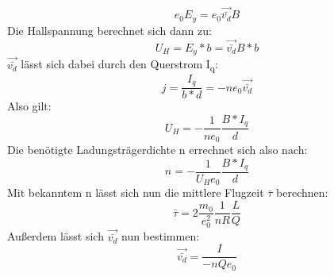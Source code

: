\documentclass[titlepage=firstcover, captions=tableheading]{scrartcl}
\begin{document}
\begin{equation}
    e_0E_y=e_0\vec{\bar{v_d}}B
\end{equation}
Die Hallspannung berechnet sich dann zu:
\begin{equation}
    U_H=E_y*b=\vec{\bar{v_d}}B*b
\end{equation}
$\vec{\bar{v_d}}$ lässt sich dabei durch den Querstrom I\textsubscript{q}:
\begin{equation}
    j=\frac{I_q}{b*d}=-ne_0\vec{\bar{v_d}}
\end{equation}
Also gilt:
\begin{equation}
    U_H=-\frac{1}{ne_0}\frac{B*I_q}{d}
\end{equation}
Die benötigte Ladungsträgerdichte n errechnet sich also nach:
\begin{equation}
    n=-\frac{1}{U_He_0}\frac{B*I_q}{d}
\end{equation}
Mit bekanntem n lässt sich nun die mittlere Flugzeit $\bar{\tau}$ berechnen:
\begin{equation}
    \bar{\tau}=2\frac{m_0}{e_0^2}\frac{1}{nR}\frac{L}{Q}
\end{equation}
Außerdem lässt sich $\vec{\bar{v_d}}$ nun bestimmen:
\begin{equation}
    \vec{\bar{v_d}}=\frac{I}{-nQe_0}
\end{equation}
\end{document}
